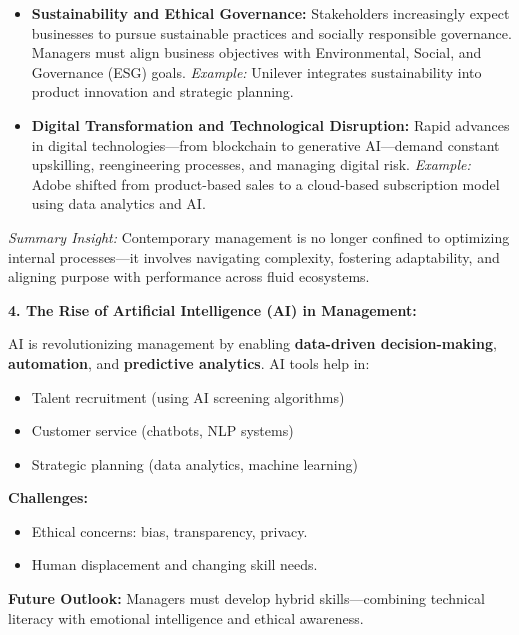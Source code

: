 \documentclass[10pt,a4paper]{book}
\begin{document}
\begin{multicols}{2}
\begin{itemize}
    \item \textbf{Sustainability and Ethical Governance:}  
    Stakeholders increasingly expect businesses to pursue sustainable practices and socially responsible governance. Managers must align business objectives with Environmental, Social, and Governance (ESG) goals.  
    \textit{Example:} Unilever integrates sustainability into product innovation and strategic planning.

    \item \textbf{Digital Transformation and Technological Disruption:}  
    Rapid advances in digital technologies—from blockchain to generative AI—demand constant upskilling, reengineering processes, and managing digital risk.  
    \textit{Example:} Adobe shifted from product-based sales to a cloud-based subscription model using data analytics and AI.

\end{itemize}

\vspace{0.5cm}
\textit{Summary Insight:}  
Contemporary management is no longer confined to optimizing internal processes—it involves navigating complexity, fostering adaptability, and aligning purpose with performance across fluid ecosystems.





\textbf{4. The Rise of Artificial Intelligence (AI) in Management:}

AI is revolutionizing management by enabling \textbf{data-driven decision-making}, \textbf{automation}, and \textbf{predictive analytics}. AI tools help in:
\begin{itemize}
    \item Talent recruitment (using AI screening algorithms)
    \item Customer service (chatbots, NLP systems)
    \item Strategic planning (data analytics, machine learning)
\end{itemize}

\textbf{Challenges:}
\begin{itemize}
    \item Ethical concerns: bias, transparency, privacy.
    \item Human displacement and changing skill needs.
\end{itemize}

\textbf{Future Outlook:} Managers must develop hybrid skills—combining technical literacy with emotional intelligence and ethical awareness.



\end{multicols}
\end{document}
